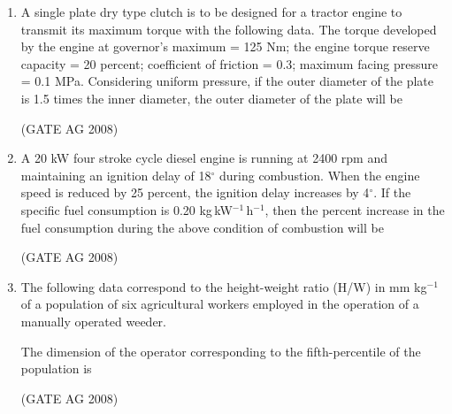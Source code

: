 \documentclass[journal,12pt,onecolumn]{IEEEtran}
\begin{document}
\begin{enumerate}
\item 
 A single plate dry type clutch is to be designed for a tractor engine to transmit its maximum torque with the following data. The torque developed by the engine at governor's maximum = 125 Nm; the engine torque reserve capacity = 20 percent; coefficient of friction = 0.3; maximum facing pressure = 0.1 MPa. Considering uniform pressure, if the outer diameter of the plate is 1.5 times the inner diameter, the outer diameter of the plate will be
\begin{enumerate}
\end{enumerate}
\hfill(GATE AG 2008)\\

\medskip

\item 
 A 20 kW four stroke cycle diesel engine is running at 2400 rpm and maintaining an ignition delay of 18$^\circ$ during combustion. When the engine speed is reduced by 25 percent, the ignition delay increases by 4$^\circ$. If the specific fuel consumption is 0.20 kg\,kW$^{-1}$\,h$^{-1}$, then the percent increase in the fuel consumption during the above condition of combustion will be
\begin{enumerate}
\end{enumerate}
\hfill(GATE AG 2008)\\

\medskip

\item 
 The following data correspond to the height-weight ratio (H/W) in mm kg$^{-1}$ of a population of six agricultural workers employed in the operation of a manually operated weeder.


The dimension of the operator corresponding to the fifth-percentile of the population is
\begin{enumerate}
\end{enumerate}
\hfill(GATE AG 2008)\\


\end{enumerate}
\end{document}
